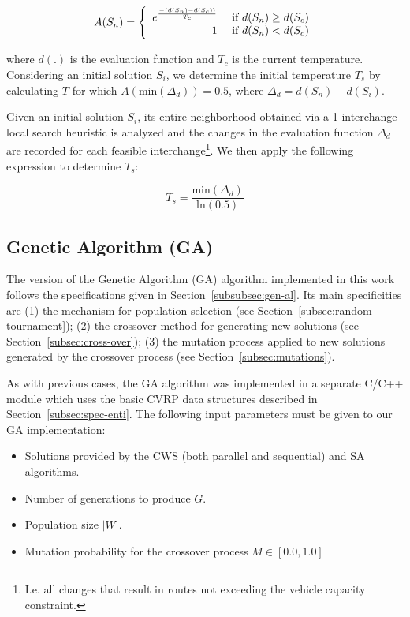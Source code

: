 \begin{equation*}
    A(S_n) = \left\{ 
        \begin{array}{rl}
            e^\frac{-(d(S_n) - d(S_c))}{T_c} &\mbox{ \text{if $d(S_n) \geq d(S_c)$}} \\
            1 &\mbox{ \text{if $d(S_n) < d(S_c)$}}
        \end{array} \right.
    \label{eq:sa-accept}
\end{equation*}

where $d(.)$ is the evaluation function and $T_c$ is the current temperature. 
Considering an initial solution $S_i$, we determine the initial temperature 
$T_s$ by calculating $T$ for which $A(\text{min}(\Delta_d)) = 0.5$, 
where $\Delta_d = d(S_n) - d(S_i)$.\vertbreak

Given an initial solution $S_i$, its entire neighborhood obtained via a 
1-interchange local search heuristic is analyzed and the changes in the 
evaluation function $\Delta_d$ 
are recorded for each feasible interchange\footnote{I.e. all changes that 
result in routes not exceeding the vehicle capacity constraint.}. We then 
apply the following expression to determine $T_s$:

\[T_s = \frac{\text{min}(\Delta_{d})}{\text{ln}(0.5)}\]

\subsection{Genetic Algorithm (GA)}
\label{subsec:ga}

The version of the Genetic Algorithm (GA) algorithm implemented in this work 
follows the specifications given in Section~\ref{subsubsec:gen-al}. Its main 
specificities are (1) the mechanism for 
population selection (see Section~\ref{subsec:random-tournament}); (2) the 
crossover method for generating new solutions (see 
Section~\ref{subsec:cross-over}); (3) the mutation process applied to 
new solutions generated by the crossover process (see 
Section~\ref{subsec:mutations}).\vertbreak

As with previous cases, the GA algorithm was implemented in a separate 
C\slash C++ module which uses the basic CVRP data structures described in 
Section~\ref{subsec:spec-enti}. The following input 
parameters must be given to our GA implementation:

\begin{itemize}
    \item Solutions provided by the CWS (both parallel and sequential) and SA 
            algorithms.
    \item Number of generations to produce $G$.
    \item Population size $|W|$.
    \item Mutation probability for the crossover process $M \in [0.0, 1.0]$
\end{itemize}\vertbreak

